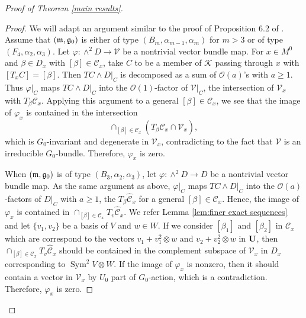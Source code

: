 \documentclass[12pt]{amsart}
\theoremstyle{plain}
\theoremstyle{definition}
\def\Sym{\operatorname{Sym}}
\begin{document}
\begin{proof} [Proof of Theorem \ref{main results}]
\begin{proof}
We will adapt an argument similar to the proof of Proposition 6.2 of \cite{HH}. Assume that $(\frak m, \frak g_0)$ is either of type $(B_m, \alpha_{m-1}, \alpha_m )$ for $m > 3$ or of type $(F_4, \alpha_2, \alpha_3 )$. Let   $\varphi :\wedge^2 D \rightarrow \mathcal V$  be a nontrivial  vector bundle map.    For  $x \in M^0$ and $\beta \in D_x$ with $[\beta]\in \mathcal C_x$, take $C$ to be a member of $\mathcal K$ passing through $x$ with $[T_xC] =[\beta]$. Then $TC \wedge D|_C $  is decomposed as a sum of $\mathcal O(a)$'s with $a \geq 1$. Thus $\varphi|_C$ maps $TC \wedge D|_C $ into the $\mathcal O(1)$-factor of $\mathcal V|_C$, the intersection of $\mathcal V_x $ with $T_{\beta}\widehat{\mathcal C}_x$. Applying this argument to a general $[\beta] \in \mathcal C_x$, we see that the image of $\varphi_x$ is contained in the intersection
\begin{equation*}
    \cap_{[\beta] \in \mathcal C_x}(T_{ \beta }\widehat{\mathcal C}_x \cap \mathcal V_x),
\end{equation*}
which is $G_0$-invariant and degenerate in $\mathcal V_x$, contradicting to the fact that $\mathcal V$ is an irreducible $G_0$-bundle. Therefore, $\varphi_x$ is zero.

When $(\frak m, \frak g_0)$ is of type $(B_3, \alpha_{2}, \alpha_3 )$, let   $\varphi :\wedge^2 D \rightarrow D$  be a nontrivial  vector bundle map. As the same argument as above, $\varphi|_C$ maps $TC \wedge D|_C $ into the $\mathcal O(a)$-factors of $D|_C$ with $a \geq 1$, the $T_{\beta}\widehat{\mathcal C}_x$ for a general $[\beta] \in \mathcal C_x$. Hence, the image of $\varphi_x$ is contained in $\cap_{[\beta] \in \mathcal C_x} T_{ v }\widehat{\mathcal C}_x$. We refer Lemma \ref{lem:finer exact sequences} and let $\{ v_1, v_2 \}$ be a basis of $V$ and $w \in W$. If we consider $[\beta_1]$ and $[\beta_2]$ in ${\mathcal C}_x$ which are correspond to the vectors $v_1+v^2_1 \otimes w$ and $v_2+v^2_2\otimes w$ in $\bf U$, then $\cap_{[\beta] \in \mathcal C_x} T_{ v }\widehat{\mathcal C}_x$ should be contained in the complement subspace of $\mathcal V_x$ in $D_x$ corresponding to $\Sym^2 V \otimes W$. If the image of $\varphi_x$ is nonzero, then it should contain a vector in $\mathcal V_x$ by $U_0$ part of $G_0$-action, which is a contradiction. Therefore, $\varphi_x$ is zero.


\end{proof}
\end{proof}
\end{document}
